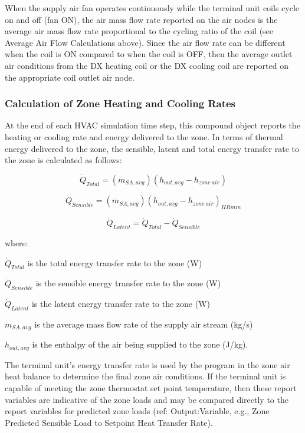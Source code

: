 When the supply air fan operates continuously while the terminal unit coils cycle on and off (fan ON), the air mass flow rate reported on the air nodes is the average air mass flow rate proportional to the cycling ratio of the coil (see Average Air Flow Calculations above). Since the air flow rate can be different when the coil is ON compared to when the coil is OFF, then the average outlet air conditions from the DX heating coil or the DX cooling coil are reported on the appropriate coil outlet air node.

\subsubsection{Calculation of Zone Heating and Cooling Rates}\label{calculation-of-zone-heating-and-cooling-rates-2}

At the end of each HVAC simulation time step, this compound object reports the heating or cooling rate and energy delivered to the zone. In terms of thermal energy delivered to the zone, the sensible, latent and total energy transfer rate to the zone is calculated as follows:

\begin{equation}
  \dot{Q}_{Total} = \left( \dot{m}_{SA,avg} \right) \left( h_{out,avg} - h_{zone~air} \right)
\end{equation}

\begin{equation}
  \dot{Q}_{Sensible} = \left( \dot{m}_{SA,avg} \right) \left( h_{out,avg} - h_{zone~air} \right)_{HRmin}
\end{equation}

\begin{equation}
  \dot{Q}_{Latent} = \dot{Q}_{Total} - \dot{Q}_{Sensible}
\end{equation}

where:

\(\dot{Q}_{Total}\) is the total energy transfer rate to the zone (W)

\(\dot{Q}_{Sensible}\) is the sensible energy transfer rate to the zone (W)

\(\dot{Q}_{Latent}\) is the latent energy transfer rate to the zone (W)

\(\dot{m}_{SA,avg}\) is the average mass flow rate of the supply air stream (kg/s)

\(h_{out,avg}\) is the enthalpy of the air being supplied to the zone (J/kg).

The terminal unit's energy transfer rate is used by the program in the zone air heat balance to determine the final zone air conditions. If the terminal unit is capable of meeting the zone thermostat set point temperature, then these report variables are indicative of the zone loads and may be compared directly to the report variables for predicted zone loads (ref: Output:Variable, e.g., Zone Predicted Sensible Load to Setpoint Heat Transfer Rate).

